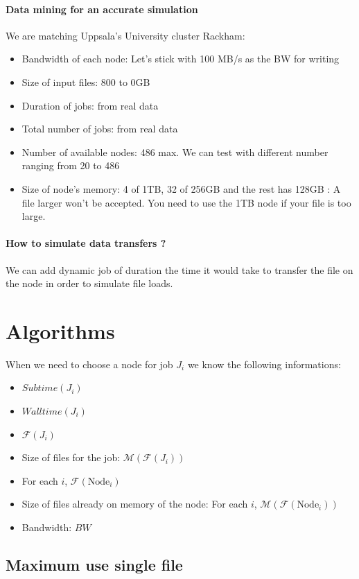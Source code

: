 \documentclass[a4paper]{article}
\newcommand{\Node}[1]{\ensuremath{\mathrm{Node}_{#1}}\xspace}
\newcommand{\inputs}{\ensuremath{\mathcal{F}}\xspace}
\newcommand{\memory}{\ensuremath{\mathcal{M}}\xspace}
\newcommand{\bandwidth}{\mathit{BW}\xspace}
\newcommand{\submissiontime}{\mathit{Subtime}\xspace}
\newcommand{\walltime}{\mathit{Walltime}\xspace}
\begin{document}
\paragraph{Data mining for an accurate simulation}
We are matching Uppsala's University cluster Rackham:
\begin{itemize}
	\item	Bandwidth of each node: Let's stick with 100 MB/s as the BW for writing
	\item	Size of input files: 800 to 0GB
	\item	Duration of jobs: from real data
	\item	Total number of jobs: from real data
	\item	Number of available nodes: 486 max. We can test with different number ranging from 20 to 486
	\item	Size of node's memory: 4 of 1TB, 32 of 256GB and the rest has 128GB : A file larger won't be accepted. You need to use the 1TB node if your file is too large.
\end{itemize}

\paragraph{How to simulate data transfers ?}
We can add dynamic job of duration the time it would take to transfer the file on the node in order
to simulate file loads.

\section{Algorithms}

When we need to choose a node for job $J_i$ we know the following informations:
\begin{itemize}
	\item $\submissiontime(J_i)$
	\item $\walltime(J_i)$
	\item $\inputs(J_i)$
	\item Size of files for the job: $\memory(\inputs(J_i))$
	\item For each $i$, $\inputs(\Node{i})$
	\item Size of files already on memory of the node: For each $i$, $\memory(\inputs(\Node{i}))$
	\item Bandwidth: $\bandwidth$
\end{itemize}

\subsection{Maximum use single file}
\end{document}
